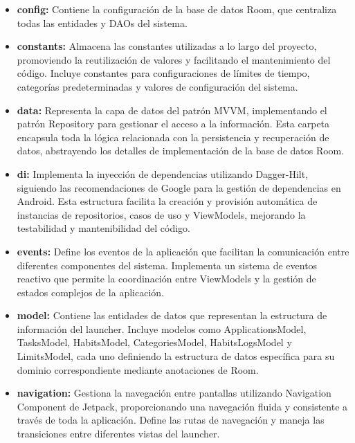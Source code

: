 \begin{itemize}
    \item \textbf{config:} Contiene la configuración de la base de datos Room, que centraliza todas las entidades y DAOs del sistema.
    
    \item \textbf{constants:} Almacena las constantes utilizadas a lo largo del proyecto, promoviendo la reutilización de valores y facilitando el mantenimiento del código. Incluye constantes para configuraciones de límites de tiempo, categorías predeterminadas y valores de configuración del sistema.
    
    \item \textbf{data:} Representa la capa de datos del patrón MVVM, implementando el patrón Repository para gestionar el acceso a la información. Esta carpeta encapsula toda la lógica relacionada con la persistencia y recuperación de datos, abstrayendo los detalles de implementación de la base de datos Room.
    
    \item \textbf{di:} Implementa la inyección de dependencias utilizando Dagger-Hilt, siguiendo las recomendaciones de Google para la gestión de dependencias en Android. Esta estructura facilita la creación y provisión automática de instancias de repositorios, casos de uso y ViewModels, mejorando la testabilidad y mantenibilidad del código.
    
    \item \textbf{events:} Define los eventos de la aplicación que facilitan la comunicación entre diferentes componentes del sistema. Implementa un sistema de eventos reactivo que permite la coordinación entre ViewModels y la gestión de estados complejos de la aplicación.
    
    \item \textbf{model:} Contiene las entidades de datos que representan la estructura de información del launcher. Incluye modelos como ApplicationsModel, TasksModel, HabitsModel, CategoriesModel, HabitsLogsModel y LimitsModel, cada uno definiendo la estructura de datos específica para su dominio correspondiente mediante anotaciones de Room.
    
    \item \textbf{navigation:} Gestiona la navegación entre pantallas utilizando Navigation Component de Jetpack, proporcionando una navegación fluida y consistente a través de toda la aplicación. Define las rutas de navegación y maneja las transiciones entre diferentes vistas del launcher.
    

\end{itemize}
